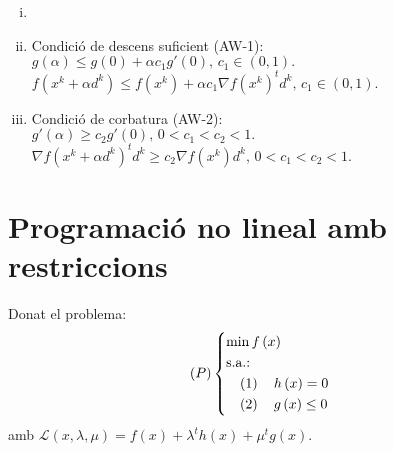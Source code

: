 \begin{prop} \label{prop:arm}
    \begin{enumerate}[i)]
        \item[]
        \item Condici\'o de descens suficient (AW-1): \\
            $g\left( \alpha \right) \leq g\left( 0 \right) + \alpha c_1g'\left( 0 \right),\, c_1 \in (0,1).$ \\
            $f\left( x^k + \alpha d^k \right) \leq f\left( x^k \right) + \alpha c_1 \nabla f\left( x^k \right)^t d^k,\, c_1 \in (0,1).$
        \item Condici\'o de corbatura (AW-2): \\
            $g'\left( \alpha \right) \geq c_2 g'\left( 0 \right),\, 0 < c_1 < c_2 < 1.$ \\
            $\nabla f\left( x^k + \alpha d^k \right)^td^k \geq c_2 \nabla f\left( x^k \right)d^k,\, 0 < c_1 < c_2 < 1$.
    \end{enumerate}
\end{prop}

\section{Programaci\'o no lineal amb restriccions}

Donat el problema:
\begin{equation*}
    \lp P \rp \begin{dcases*}
        \min f \left( x \right) \\
        \text{s.a.: } \\
        \quad \left( 1 \right) \quad h \left( x \right) = 0 \\
        \quad \left( 2 \right) \quad g \left( x \right) \leq 0 \\
    \end{dcases*}
\end{equation*}
amb $\mathcal{L} \left( x, \lambda, \mu \right) = f\left( x \right) + \lambda^t h\left( x \right) + \mu^t g\left( x \right)$.


